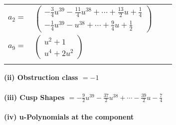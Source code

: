 \documentclass[1p]{elsarticle_modified}
\theoremstyle{definition}
\begin{document}
\begin{tabular}{m{7pt} m{180pt} m{7pt} m{180pt} }
\flushright $a_{2}=$&$\begin{pmatrix}-\frac{3}{4} u^{39}-\frac{11}{4} u^{38}+\cdots+\frac{13}{2} u+\frac{1}{4}\\-\frac{1}{4} u^{39}- u^{38}+\cdots+\frac{9}{4} u+\frac{1}{2}\end{pmatrix}$ \\
\flushright $a_{9}=$&$\begin{pmatrix}u^2+1\\u^4+2 u^2\end{pmatrix}$\\&\end{tabular}
\flushleft \textbf{(ii) Obstruction class $= -1$}\\~\\
\flushleft \textbf{(iii) Cusp Shapes $= -\frac{9}{2} u^{39}-\frac{37}{2} u^{38}+\cdots-\frac{39}{2} u-\frac{7}{4}$}\\~\\
\newpage\renewcommand{\arraystretch}{1}
\flushleft \textbf{(iv) u-Polynomials at the component}\newline \\
\end{document}
